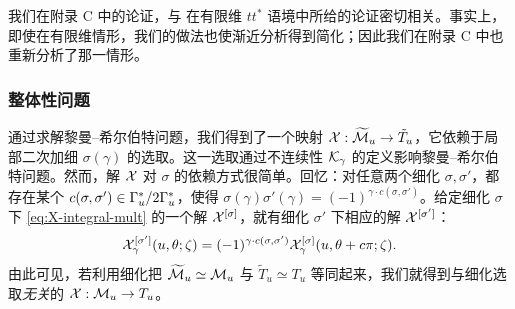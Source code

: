 我们在附录 C 中的论证，与 \cite{Cecotti:1993rm} 在有限维 $tt^*$ 语境中所给的论证密切相关。事实上，即使在有限维情形，我们的做法也使渐近分析得到简化；因此我们在附录 C 中也重新分析了那一情形。%

\subsubsection*{整体性问题}

通过求解黎曼--希尔伯特问题，我们得到了一个映射 $\mathcal{X}:\widetilde{\mathcal{M}}_u\to\tilde T_u$，它依赖于局部二次加细 $\sigma(\gamma)$ 的选取。这一选取通过不连续性 $\mathcal{K}_\gamma$ 的定义影响黎曼--希尔伯特问题。然而，解 $\mathcal{X}$ 对 $\sigma$ 的依赖方式很简单。回忆：对任意两个细化 $\sigma,\sigma'$，都存在某个 $c(\sigma,\sigma')\in\Gamma_u^*/2\Gamma_u^*$，使得 $\sigma(\gamma)\sigma'(\gamma)=(-1)^{\gamma\cdot c(\sigma,\sigma')}$。给定细化 $\sigma$ 下 \eqref{eq:X-integral-mult} 的一个解 $\mathcal{X}^{[\sigma]}$，就有细化 $\sigma'$ 下相应的解 $\mathcal{X}^{[\sigma']}$：
\begin{equation}
\mathcal{X}_\gamma^{[\sigma']}(u,\theta;\zeta) = (-1)^{\gamma \cdot c(\sigma,\sigma')} \mathcal{X}_\gamma^{[\sigma]}(u,\theta + c \pi;\zeta).
\end{equation}
由此可见，若利用细化把 $\widetilde{\mathcal{M}}_u\simeq\mathcal{M}_u$ 与 $\tilde T_u\simeq T_u$ 等同起来，我们就得到与细化选取\emph{无关}的 $\mathcal{X}:\mathcal{M}_u\to T_u$。
